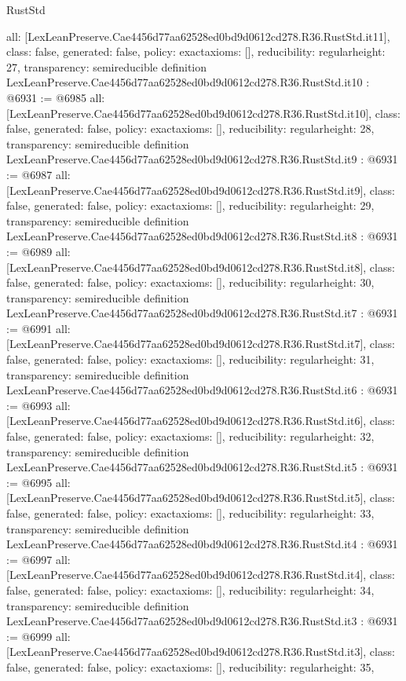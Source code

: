 \begin{lexlean}{RustStd}
\begin{coremodule}
{  all: [LexLeanPreserve.Cae4456d77aa62528ed0bd9d0612cd278.R36.RustStd.it11],
  class: false,
  generated: false,
  policy: exact{axioms: []},
  reducibility: regular{height: 27},
  transparency: semireducible
}
definition LexLeanPreserve.Cae4456d77aa62528ed0bd9d0612cd278.R36.RustStd.it10 : @6931 := @6985 {
  all: [LexLeanPreserve.Cae4456d77aa62528ed0bd9d0612cd278.R36.RustStd.it10],
  class: false,
  generated: false,
  policy: exact{axioms: []},
  reducibility: regular{height: 28},
  transparency: semireducible
}
definition LexLeanPreserve.Cae4456d77aa62528ed0bd9d0612cd278.R36.RustStd.it9 : @6931 := @6987 {
  all: [LexLeanPreserve.Cae4456d77aa62528ed0bd9d0612cd278.R36.RustStd.it9],
  class: false,
  generated: false,
  policy: exact{axioms: []},
  reducibility: regular{height: 29},
  transparency: semireducible
}
definition LexLeanPreserve.Cae4456d77aa62528ed0bd9d0612cd278.R36.RustStd.it8 : @6931 := @6989 {
  all: [LexLeanPreserve.Cae4456d77aa62528ed0bd9d0612cd278.R36.RustStd.it8],
  class: false,
  generated: false,
  policy: exact{axioms: []},
  reducibility: regular{height: 30},
  transparency: semireducible
}
definition LexLeanPreserve.Cae4456d77aa62528ed0bd9d0612cd278.R36.RustStd.it7 : @6931 := @6991 {
  all: [LexLeanPreserve.Cae4456d77aa62528ed0bd9d0612cd278.R36.RustStd.it7],
  class: false,
  generated: false,
  policy: exact{axioms: []},
  reducibility: regular{height: 31},
  transparency: semireducible
}
definition LexLeanPreserve.Cae4456d77aa62528ed0bd9d0612cd278.R36.RustStd.it6 : @6931 := @6993 {
  all: [LexLeanPreserve.Cae4456d77aa62528ed0bd9d0612cd278.R36.RustStd.it6],
  class: false,
  generated: false,
  policy: exact{axioms: []},
  reducibility: regular{height: 32},
  transparency: semireducible
}
definition LexLeanPreserve.Cae4456d77aa62528ed0bd9d0612cd278.R36.RustStd.it5 : @6931 := @6995 {
  all: [LexLeanPreserve.Cae4456d77aa62528ed0bd9d0612cd278.R36.RustStd.it5],
  class: false,
  generated: false,
  policy: exact{axioms: []},
  reducibility: regular{height: 33},
  transparency: semireducible
}
definition LexLeanPreserve.Cae4456d77aa62528ed0bd9d0612cd278.R36.RustStd.it4 : @6931 := @6997 {
  all: [LexLeanPreserve.Cae4456d77aa62528ed0bd9d0612cd278.R36.RustStd.it4],
  class: false,
  generated: false,
  policy: exact{axioms: []},
  reducibility: regular{height: 34},
  transparency: semireducible
}
definition LexLeanPreserve.Cae4456d77aa62528ed0bd9d0612cd278.R36.RustStd.it3 : @6931 := @6999 {
  all: [LexLeanPreserve.Cae4456d77aa62528ed0bd9d0612cd278.R36.RustStd.it3],
  class: false,
  generated: false,
  policy: exact{axioms: []},
  reducibility: regular{height: 35},
}
\end{coremodule}
\end{lexlean}
